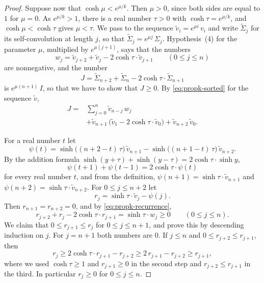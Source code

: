 \documentclass{amsart}
\theoremstyle{definition}
\theoremstyle{remark}
\numberwithin{equation}{section}
\begin{document}
\begin{proof}
Suppose now that $\cosh\mu<e^{\mu/k}$. Then $\mu>0$, since both sides are
equal to $1$ for $\mu=0$. As $e^{\mu/k}>1$, there is a real number $\tau>0$
with $\cosh\tau=e^{\mu/k}$, and $\cosh\mu<\cosh\tau$ gives $\mu<\tau$. We
pass to the sequence $\tilde v_i=e^{\mu i}\,v_i$ and write
$\widetilde{\Sigma}_j$ for its self-convolution at length $j$, so that
$\widetilde{\Sigma}_j=e^{\mu j}\,\Sigma_j$. Hypothesis~(4) for the parameter
$\mu$, multiplied by $e^{\mu(j+1)}$, says that the numbers
\[
w_j=\tilde v_{j+2}+\tilde v_j-2\cosh\tau\cdot\tilde v_{j+1}
\qquad(0\le j\le n)
\]
are nonnegative, and the number
\[
J=\widetilde{\Sigma}_{n+2}+\widetilde{\Sigma}_n
-2\cosh\tau\cdot\widetilde{\Sigma}_{n+1}
\]
is $e^{\mu(n+1)}\,I$, so that we have to show that $J\ge0$. By
\eqref{eq:propk-sorted} for the sequence $\tilde v$,
\begin{equation}\label{eq:propk-tilted}
\begin{split}
J={}&\sum_{j=0}^{n}\tilde v_{n-j}\,w_j\\
&+\tilde v_{n+1}\,\bigl(\tilde v_1-2\cosh\tau\cdot\tilde v_0\bigr)
+\tilde v_{n+2}\,\tilde v_0 .
\end{split}
\end{equation}

For a real number $t$ let
\[
\psi(t)=\sinh\bigl((n+2-t)\,\tau\bigr)\,\tilde v_{n+1}
-\sinh\bigl((n+1-t)\,\tau\bigr)\,\tilde v_{n+2} .
\]
By the addition formula
$\sinh(y+\tau)+\sinh(y-\tau)=2\cosh\tau\cdot\sinh y$,
\begin{equation}\label{eq:propk-recurrence}
\psi(t+1)+\psi(t-1)=2\cosh\tau\cdot\psi(t)
\end{equation}
for every real number $t$, and from the definition,
$\psi(n+1)=\sinh\tau\cdot\tilde v_{n+1}$ and
$\psi(n+2)=\sinh\tau\cdot\tilde v_{n+2}$. For $0\le j\le n+2$ let
\[
r_j=\sinh\tau\cdot\tilde v_j-\psi(j) .
\]
Then $r_{n+1}=r_{n+2}=0$, and by \eqref{eq:propk-recurrence},
\[
r_{j+2}+r_j-2\cosh\tau\cdot r_{j+1}=\sinh\tau\cdot w_j\ge0
\qquad(0\le j\le n).
\]
We claim that $0\le r_{j+1}\le r_j$ for $0\le j\le n+1$, and prove this by
descending induction on $j$. For $j=n+1$ both numbers are $0$. If
$j\le n$ and $0\le r_{j+2}\le r_{j+1}$, then
\[
r_j\ge2\cosh\tau\cdot r_{j+1}-r_{j+2}\ge2\,r_{j+1}-r_{j+2}\ge r_{j+1},
\]
where we used $\cosh\tau\ge1$ and $r_{j+1}\ge0$ in the second step and
$r_{j+2}\le r_{j+1}$ in the third. In particular $r_j\ge0$ for
$0\le j\le n$.


\end{proof}
\end{document}

